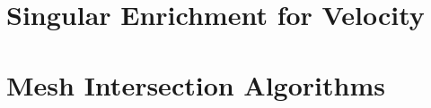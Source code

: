 \documentclass[bibliography=totocnumbered,dvipsnames,FM,Dis]{tulthesis}
\begin{document}
\chapter{Singular Enrichment for Velocity} \label{chap:xfem_mh}















\chapter{Mesh Intersection Algorithms} \label{chap:intersections}





\end{document}
